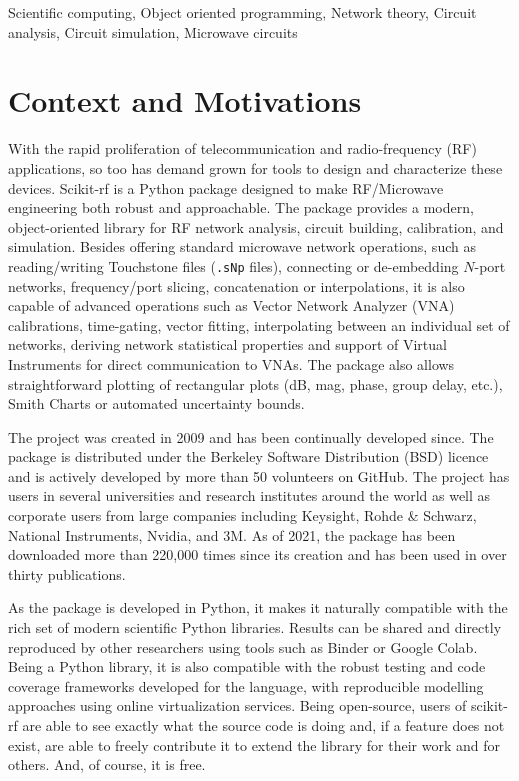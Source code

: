 \documentclass{IEEEjmw}
\begin{document}
\begin{IEEEkeywords}
Scientific computing, Object oriented programming, Network theory, Circuit analysis, Circuit simulation, Microwave circuits
\end{IEEEkeywords}

\maketitle

\section{Context and Motivations}
With the rapid proliferation of telecommunication and radio-frequency (RF) applications, so too has demand grown for tools to design and characterize these devices. Scikit-rf is a Python package designed to make RF/Microwave engineering both robust and approachable. The package provides a modern, object-oriented library for RF network analysis, circuit building, calibration, and simulation. Besides offering standard microwave network operations, such as reading/writing Touchstone files (\texttt{.sNp} files), connecting or de-embedding $N$-port networks, frequency/port slicing, concatenation or interpolations, it is also capable of advanced operations such as Vector Network Analyzer (VNA) calibrations, time-gating, vector fitting, interpolating between an individual set of networks, deriving network statistical properties and support of Virtual Instruments for direct communication to VNAs. The package also allows straightforward plotting of rectangular plots (dB, mag, phase, group delay, etc.), Smith Charts or automated uncertainty bounds.
 
The project was created in 2009 and has been continually developed since. The package is distributed under the Berkeley Software Distribution (BSD) licence and is actively developed by more than 50 volunteers on GitHub. The project has users in several universities and research institutes around the world as well as corporate users from large companies including Keysight, Rohde \& Schwarz, National Instruments, Nvidia, and 3M. As of 2021, the package has been downloaded more than 220,000 times since its creation and has been used in over thirty publications.

As the package is developed in Python, it makes it naturally compatible with the rich set of modern scientific Python libraries. Results can be shared and directly reproduced by other researchers using tools such as Binder or Google Colab. Being a Python library, it is also compatible with the robust testing and code coverage frameworks developed for the language, with reproducible modelling approaches using online virtualization services. Being open-source, users of scikit-rf are able to see exactly what the source code is doing and, if a feature does not exist, are able to freely contribute it to extend the library for their work and for others. And, of course, it is free.
\end{document}
